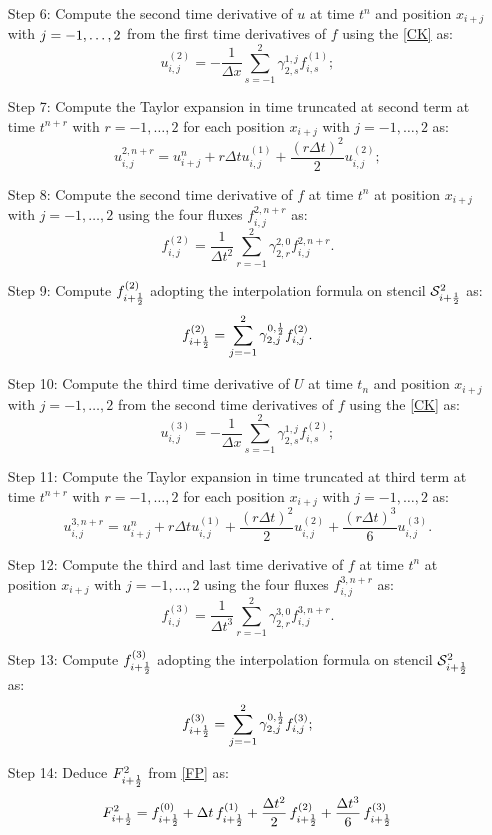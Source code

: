 \begin{itemize}
    \item[Step 6:] Compute the second time derivative of $u$ at time $t^n$ and position $x_{i+j}$ with $j=\nobreak -1,\ldots,2$ from the first time derivatives of $f$ using the \eqref{CK} as:
    $$ u_{i,j}^{(2)} = -\frac{1}{\Delta x}\sum_{s = -1}^2\gamma_{2,s}^{1,j}f_{i,s}^{(1)}; $$
    \item[Step 7:] Compute the Taylor expansion in time truncated at second term at time $t^{n+r}$ with $r=-1,\ldots,2$ for each position $x_{i+j}$ with $j=-1,\ldots,2$ as:
    $$ u_{i,j}^{2,n+r} = u_{i+j}^n + r\Delta t u_{i,j}^{(1)} + \frac{(r\Delta t)^2}{2}u^{(2)}_{i,j}; $$
    \item[Step 8:] Compute the second time derivative of $f$ at time $t^n$ at position $x_{i+j}$ with $j = -1,\ldots,2$ using the four fluxes $f_{i,j}^{2,n+r}$ as:
    $$ f_{i,j}^{(2)} = \frac{1}{\Delta t^2}\sum_{r=-1}^2\gamma_{2,r}^{2,0}f_{i,j}^{2,n+r} . $$
    \item[Step 9:] Compute $f^{(2)}_{i+\frac{1}{2}}$ adopting the interpolation formula on stencil $\mathcal{S}^2_{i+\frac{1}{2}}$ as:
    $$ f^{(2)}_{i+\frac{1}{2}} = \sum_{j=-1}^2\gamma_{2,j}^{0,\frac{1}{2}}f_{i,j}^{(2)} .$$
    \item[Step 10:] Compute the third time derivative of $U$ at time $t_n$ and position $x_{i+j}$ with $j=-1,\ldots,2$ from the second time derivatives of $f$ using the \eqref{CK} as:
    $$ u_{i,j}^{(3)} = -\frac{1}{\Delta x}\sum_{s = -1}^2\gamma_{2,s}^{1,j}f_{i,s}^{(2)}; $$
    \item[Step 11:] Compute the Taylor expansion in time truncated at third term at time $t^{n+r}$ with $r=-1,\ldots,2$ for each position $x_{i+j}$ with $j=-1,\ldots,2$ as:
    $$ u_{i,j}^{3,n+r} = u_{i+j}^n + r\Delta t u_{i,j}^{(1)} + \frac{(r\Delta t)^2}{2}u^{(2)}_{i,j} + \frac{(r\Delta t)^3}{6}u^{(3)}_{i,j} . $$
    \item[Step 12:] Compute the third and last time derivative of $f$ at time $t^n$ at position $x_{i+j}$ with $j = -1,\ldots,2$ using the four fluxes $f_{i,j}^{3,n+r}$ as:
    $$ f_{i,j}^{(3)} = \frac{1}{\Delta t^3}\sum_{r=-1}^2\gamma_{2,r}^{3,0}f_{i,j}^{3,n+r} . $$
    \item[Step 13:] Compute $f^{(3)}_{i+\frac{1}{2}}$ adopting the interpolation formula on stencil $\mathcal{S}^2_{i+\frac{1}{2}}$ as:
    $$ f^{(3)}_{i+\frac{1}{2}} = \sum_{j=-1}^2\gamma_{2,j}^{0,\frac{1}{2}}f_{i,j}^{(3)}; $$
    \item[Step 14:] Deduce $F^2_{i+\frac{1}{2}}$ from \eqref{FP} as:
    $$ F^2_{i+\frac{1}{2}} = f_{i+\frac{1}{2}}^{(0)} + \Delta t \, f_{i+\frac{1}{2}}^{(1)} + \frac{\Delta t^2}{2} \, f_{i+\frac{1}{2}}^{(2)} + \frac{\Delta t^3}{6} \, f_{i+\frac{1}{2}}^{(3)}   $$
\end{itemize}


